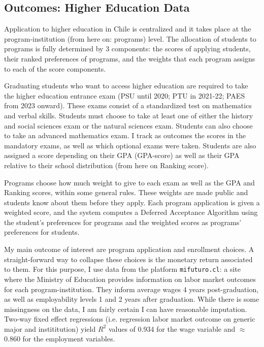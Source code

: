 \documentclass[12pt]{article}
\newcommand{\blue}[1]{\textcolor{blue}{#1}}
\begin{document}

\subsection{Outcomes: Higher Education Data}

Application to higher education in Chile is centralized and it takes place at the program-institution (from here on: programs) level.  The allocation of students to programs is fully determined by 3 components: the scores of applying students, their ranked preferences of programs, and the weights that each program assigns to each of the score components. 


Graduating students who want to access higher education are required to take the higher education entrance exam (PSU until 2020; PTU in 2021-22; PAES from 2023 onward). These exams consist of a standardized test on mathematics and verbal skills. Students must choose to take at least one of either the history and social sciences exam or the natural sciences exam. Students can also choose to take an advanced mathematics exam. I track as outcomes the scores in the mandatory exams, as well as which optional exams were taken. Students are also assigned a score depending on their GPA (GPA-score) as well as their GPA relative to their school distribution (from here on Ranking score). 

Programs choose how much weight to give to each exam as well as the GPA and Ranking scores, within some general rules. These weights are made public and students know about them before they apply. Each program application is given a weighted score, and the system computes a Deferred Acceptance Algorithm using the student's preferences for programs and the weighted scores as programs' preferences for students. 


My main outcome of interest are program application and enrollment choices. A straight-forward way to collapse these choices is the monetary return associated to them. For this purpose, I use data from the platform \texttt{mifuturo.cl}: a site where the Ministry of Education provides information on labor market outcomes for each program-institution. They inform average wages 4 years post-graduation, as well as employability levels 1 and 2 years after graduation. While there is some missingness on the data, I am fairly certain I can have reasonable imputation. Two-way fixed effect regressions (i.e. regression labor market outcome on generic major and 
instititution) yield $R^2$ values of 0.934 for the wage variable and $\approx$ 0.860 for the employment variables. 
\end{document}
